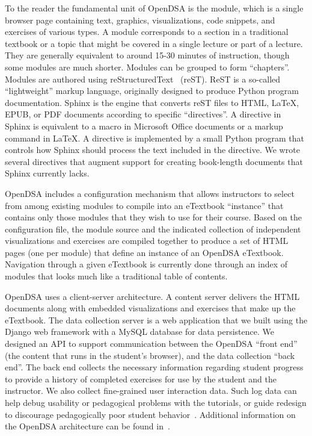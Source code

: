 \documentclass[11pt]{article}
\begin{document}
To the reader the fundamental unit of OpenDSA is the module, which is
a single browser page containing text, graphics, visualizations, code
snippets, and exercises of various types.
A module corresponds to a section in a traditional
textbook or a topic that might be covered in a single lecture or part
of a lecture.
They are generally equivalent to around 15-30 minutes of
instruction, though some modules are much shorter.
Modules can be grouped to form ``chapters''.
Modules are authored using reStructuredText~\cite{RST} (reST).
ReST is a so-called ``lightweight'' markup language, originally
designed to produce Python program documentation.
Sphinx is the engine that converts reST files to HTML, LaTeX, EPUB,
or PDF documents according to specific ``directives''.
A directive in Sphinx is equivalent to a macro in Microsoft Office
documents or a markup command in LaTeX.
A directive is implemented by a small Python program that controls how
Sphinx should process the text included in the directive.
We wrote several directives that augment support for creating
book-length documents that Sphinx currently lacks.

OpenDSA includes a configuration mechanism that allows instructors to
select from among existing modules to compile into an
eTextbook ``instance'' that contains only those modules that they wish
to use for their course.
Based on the configuration file, the module source and the indicated
collection of independent visualizations and exercises are compiled
together to produce a set of HTML pages (one per module) that define
an instance of an OpenDSA eTextbook.
Navigation through a given eTextbook is currently done through an
index of modules that looks much like a traditional table of contents.

OpenDSA uses a client-server architecture.
A content server delivers the HTML documents along with embedded
visualizations and exercises that make up the eTextbook.
The data collection server is a web application that we built using
the Django web framework with a MySQL database for data persistence.
We designed an API to support communication between the OpenDSA
``front end'' (the content that runs in the student's browser),
and the data collection ``back end''.
The back end collects the necessary information regarding student
progress to provide a history of completed exercises for use by the
student and the instructor.
We also collect fine-grained user interaction data.
Such log data can help debug usability or pedagogical problems with
the tutorials, or guide redesign to discourage pedagogically poor
student behavior~\cite{Breakiron2013}.
Additional information on the OpenDSA architecture can be found
in~\cite{Fouh14}.
\end{document}
